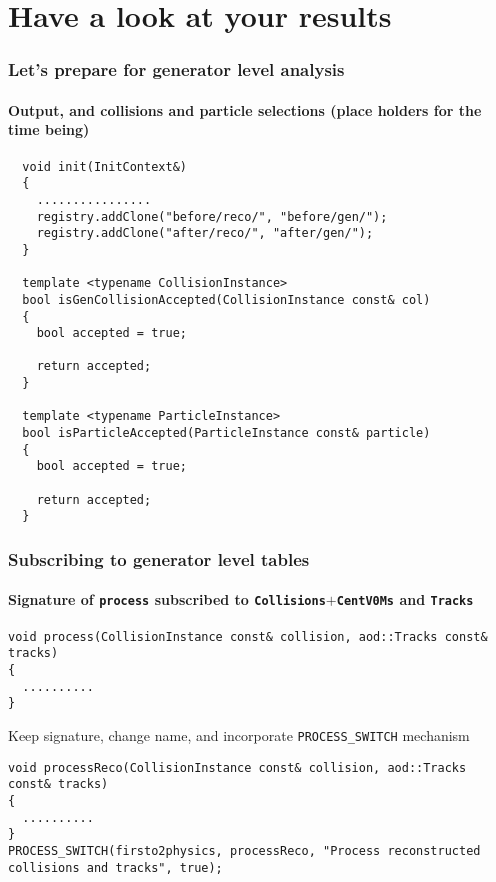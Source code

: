 \documentclass[14pt,aspectratio=169,t]{beamer}
\begin{document}
\section{Have a look at your results}

\begin{frame}[fragile]
  \frametitle{Let's prepare for generator level analysis}
  \framesubtitle{Output, and collisions and particle selections (place holders for the time being)}
  {\tiny\color{blue}
  \begin{verbatim}
  void init(InitContext&)
  {
    ................
    registry.addClone("before/reco/", "before/gen/");
    registry.addClone("after/reco/", "after/gen/");
  }

  template <typename CollisionInstance>
  bool isGenCollisionAccepted(CollisionInstance const& col)
  {
    bool accepted = true;

    return accepted;
  }

  template <typename ParticleInstance>
  bool isParticleAccepted(ParticleInstance const& particle)
  {
    bool accepted = true;

    return accepted;
  }
  \end{verbatim}}
\end{frame}

\begin{frame}[fragile]
  \frametitle{Subscribing to generator level tables}
  \framesubtitle{Signature of \texttt{process} subscribed to \texttt{Collisions}$+$\texttt{CentV0Ms} and \texttt{Tracks}}
  \vspace{-0.0in}
  \small
  {\scriptsize\color{blue}
  \begin{verbatim}
void process(CollisionInstance const& collision, aod::Tracks const& tracks)
{
  ..........
}
  \end{verbatim}}
  \vspace{-0.2in}
  Keep signature, change name, and incorporate \texttt{PROCESS\_SWITCH} mechanism
  {\scriptsize\color{blue}
  \begin{verbatim}
void processReco(CollisionInstance const& collision, aod::Tracks const& tracks)
{
  ..........
}
PROCESS_SWITCH(firsto2physics, processReco, "Process reconstructed collisions and tracks", true);
  \end{verbatim}}
\end{frame}
\end{document}

